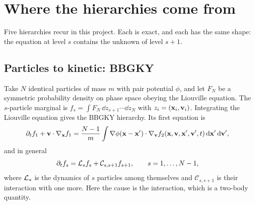 \section{Where the hierarchies come from}
\label{sec:hier}

Five hierarchies recur in this project. Each is exact, and each has the
same shape: the equation at level $s$ contains the unknown of level $s+1$.

\subsection{Particles to kinetic: BBGKY}

Take $N$ identical particles of mass $m$ with pair potential $\phi$, and let
$F_N$ be a symmetric probability density on phase space obeying the
Liouville equation. The $s$-particle marginal is
$f_s = \int F_N\,\dd z_{s+1}\cdots\dd z_N$ with $z_i = (\mathbf{x}_i,\mathbf{v}_i)$.
Integrating the Liouville equation gives the BBGKY hierarchy. Its first
equation is
\begin{equation}
  \partial_t f_1 + \mathbf{v}\cdot\nabla_{\mathbf{x}} f_1
  = \frac{N-1}{m}\int \nabla\phi(\mathbf{x}-\mathbf{x}')\cdot\nabla_{\mathbf{v}}
    f_2(\mathbf{x},\mathbf{v},\mathbf{x}',\mathbf{v}',t)\,\mathrm{d}\mathbf{x}'\,\mathrm{d}\mathbf{v}' ,
  \label{eq:bbgky1}
\end{equation}
and in general
\begin{equation}
  \partial_t f_s = \mathcal{L}_s f_s + \mathcal{C}_{s,s+1} f_{s+1},
  \qquad s = 1,\dots,N-1,
\end{equation}
where $\mathcal{L}_s$ is the dynamics of $s$ particles among themselves and
$\mathcal{C}_{s,s+1}$ is their interaction with one more. Here the cause is
the interaction, which is a two-body quantity.

